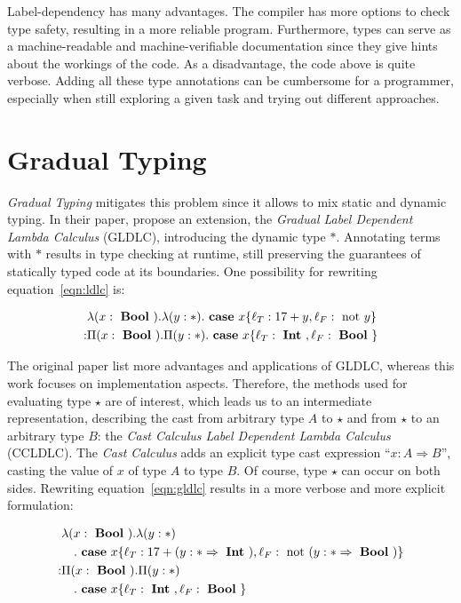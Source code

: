 Label-dependency has many advantages. The compiler has more options to check type safety, resulting in a more reliable program. Furthermore, types can serve as a machine-readable and machine-verifiable documentation since they give hints about the workings of the code.
As a disadvantage, the code above is quite verbose. Adding all these type annotations can be cumbersome for a programmer, especially when still exploring a given task and trying out different approaches.

\section{Gradual Typing}

\emph{Gradual Typing} mitigates this problem since it allows to mix static and dynamic typing. In their paper, \cite{fu2021} propose an extension, the \emph{Gradual Label Dependent Lambda Calculus} (GLDLC), introducing the dynamic type $\ast$. Annotating terms with $\ast$ results in type checking at runtime, still preserving the guarantees of statically typed code at its boundaries. One possibility for rewriting equation~\ref{eqn:ldlc} is:

\begin{equation}\label{eqn:gldlc}
\begin{split}
&\lambda (x: \text{ \textbf{Bool} })
. \lambda (y: \ast)
. \text{ \textbf{case} } x \{\ell_T: 17+y,\ell_F: \text{ not } y\} \\
: & \Pi(x : \text{ \textbf{Bool} })
. \Pi (y: \ast)
. \text{ \textbf{case} } x \{\ell_T: \text{ \textbf{Int} }, \ell_F: \text{ \textbf{Bool} } \}
\end{split}
\end{equation}

The original paper list more advantages and applications of GLDLC, whereas this work focuses on implementation aspects. Therefore, the methods used for evaluating type $\star$ are of interest, which leads us to an intermediate representation, describing the cast from arbitrary type $A$ to $\star$ and from $\star$ to an arbitrary type $B$: the \emph{Cast Calculus Label Dependent Lambda Calculus} (CCLDLC). The \emph{Cast Calculus} adds an explicit type cast expression ``$x : A \Rightarrow B$'', casting the value of $x$ of type $A$ to type $B$. Of course, type $\star$ can occur on both sides. Rewriting equation~\ref{eqn:gldlc} results in a more verbose and more explicit formulation:

\begin{equation}\label{eqn:ccldlc}
\begin{split}
&\lambda (x: \text{ \textbf{Bool} }) . \lambda (y: \ast ) \\
&\quad . \text{ \textbf{case} } x \{\ell_T: 17+(y:\ast \Rightarrow \text{ \textbf{Int} }),\ell_F: \text{ not } (y:\ast \Rightarrow \text{ \textbf{Bool} })\} \\
: & \Pi(x : \text{ \textbf{Bool} }) . \Pi (y: \ast ) \\
&\quad . \text{ \textbf{case} } x \{\ell_T: \text{ \textbf{Int} }, \ell_F: \text{ \textbf{Bool} } \}
\end{split}
\end{equation}

